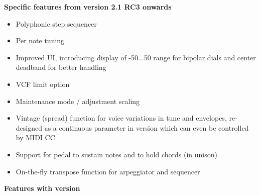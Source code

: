 \documentclass[landscape, 11pt, oneside, twoside]{report}
\newenvironment{flowtext}{\addmargin[0cm]{0cm}}{\endaddmargin} %
\begin{document}
\begin{flowtext}
\textbf{Specific features from version 2.1 RC3 onwards}
  
\begin{itemize}
  \setlength\itemsep{0cm}
  \item Polyphonic step sequencer
  \item Per note tuning
  \item Improved UI, introducing display of -50...50 range for bipolar dials and center deadband for better handling  
  \item VCF limit option
  \item Maintenance mode / adjustment scaling
  \item Vintage (spread) function for voice variations in tune and envelopes, re-designed as a continuous parameter in version \version which can even be controlled by MIDI CC   
  \item Support for pedal to sustain notes and to hold chords (in unison)
  \item On-the-fly transpose function for arpeggiator and sequencer
\end{itemize}

\textbf{Features with version \version}
  

\end{flowtext}
\end{document}
